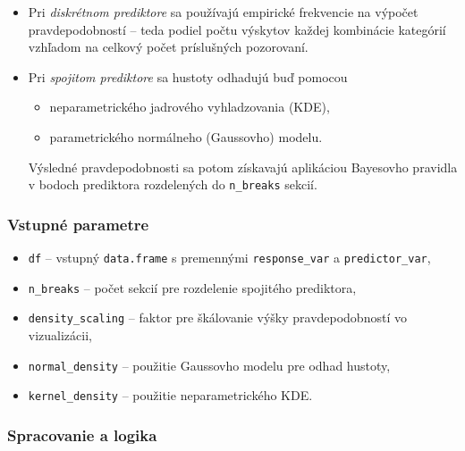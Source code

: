 \begin{itemize}
\setlength{\itemsep}{0pt}
  \setlength{\parskip}{0pt}
  \item Pri \textit{diskrétnom prediktore} sa používajú empirické frekvencie na výpočet pravdepodobností – teda podiel počtu výskytov každej kombinácie kategórií vzhľadom na celkový počet príslušných pozorovaní.
  \item Pri \textit{spojitom prediktore} sa hustoty odhadujú buď pomocou
  \begin{itemize}
    \item neparametrického jadrového vyhladzovania (KDE),
    \item parametrického normálneho (Gaussovho) modelu.
  \end{itemize}
  Výsledné pravdepodobnosti sa potom získavajú aplikáciou Bayesovho pravidla v bodoch prediktora rozdelených do \texttt{n\_breaks} sekcií.
\end{itemize}

\subsubsection{Vstupné parametre}

\begin{itemize}
\setlength{\itemsep}{0pt}
  \setlength{\parskip}{0pt}
  \item \texttt{df} – vstupný \texttt{data.frame} s premennými \texttt{response\_var} a \texttt{predictor\_var},
  \item \texttt{n\_breaks} – počet sekcií pre rozdelenie spojitého prediktora,
  \item \texttt{density\_scaling} – faktor pre škálovanie výšky pravdepodobností vo vizualizácii,
  \item \texttt{normal\_density} – použitie Gaussovho modelu pre odhad hustoty,
  \item \texttt{kernel\_density} – použitie neparametrického KDE.
\end{itemize}

\subsubsection{Spracovanie a logika}

